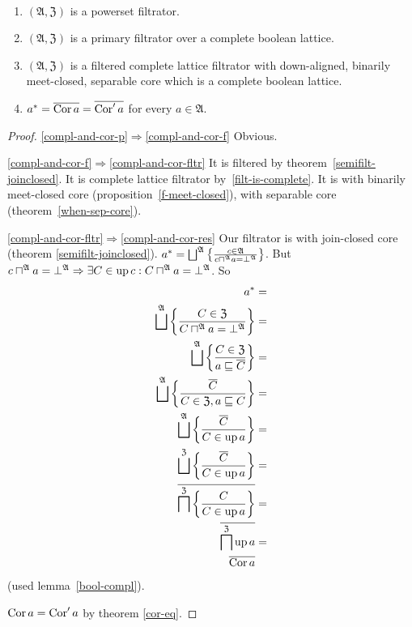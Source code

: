 \begin{thm}\label{compl-and-cor}
~
\begin{enumerate}
\item \label{compl-and-cor-p}$(\mathfrak{A},\mathfrak{Z})$ is a powerset filtrator.
\item \label{compl-and-cor-f}$(\mathfrak{A},\mathfrak{Z})$ is a primary filtrator over a complete boolean lattice.
\item \label{compl-and-cor-fltr}$(\mathfrak{A},\mathfrak{Z})$ is a filtered
complete lattice filtrator with down-aligned, binarily meet-closed,
separable core which is a complete boolean lattice.
\item \label{compl-and-cor-res} $a^{\ast}=\overline{\operatorname{Cor} a}=\overline{\operatorname{Cor}'a}$
for every $a\in\mathfrak{A}$.
\end{enumerate}
\end{thm}
\begin{proof}
\item [\ref{compl-and-cor-p}$\Rightarrow$\ref{compl-and-cor-f}] Obvious.
\item [\ref{compl-and-cor-f}$\Rightarrow$\ref{compl-and-cor-fltr}]
It is filtered by theorem~\ref{semifilt-joinclosed}. It is complete lattice filtrator by~\ref{filt-is-complete}.
It is with binarily meet-closed core (proposition~\ref{f-meet-closed}),
with separable core (theorem~\ref{when-sep-core}).
\item [\ref{compl-and-cor-fltr}$\Rightarrow$\ref{compl-and-cor-res}]
Our filtrator is with join-closed core (theorem \ref{semifilt-joinclosed}).
$a^{\ast}=\bigsqcup^{\mathfrak{A}}\setcond{c\in\mathfrak{A}}{c\sqcap^{\mathfrak{A}}a=\bot^{\mathfrak{A}}}$.
But $c\sqcap^{\mathfrak{A}}a=\bot^{\mathfrak{A}}\Rightarrow\exists C\in\operatorname{up} c:C\sqcap^{\mathfrak{A}}a=\bot^{\mathfrak{A}}$.
So
\begin{align*}
a^{\ast} & =\\
\bigsqcup^{\mathfrak{A}}\setcond{C\in\mathfrak{Z}}{C\sqcap^{\mathfrak{A}}a=\bot^{\mathfrak{A}}} & =\\
\bigsqcup^{\mathfrak{A}}\setcond{C\in\mathfrak{Z}}{a\sqsubseteq\overline{C}} & =\\
\bigsqcup^{\mathfrak{A}}\setcond{\overline{C}}{C\in\mathfrak{Z},a\sqsubseteq C} & =\\
\bigsqcup^{\mathfrak{A}}\setcond{\overline{C}}{C\in\up a} & =\\
\bigsqcup^{\mathfrak{Z}}\setcond{\overline{C}}{C\in\up a} & =\\
\overline{\bigsqcap^{\mathfrak{Z}}\setcond C{C\in\up a}} & =\\
\overline{\bigsqcap^{\mathfrak{Z}}\up a} & =\\
\overline{\Cor a}
\end{align*}
(used lemma~\ref{bool-compl}).

$\operatorname{Cor} a=\operatorname{Cor}'a$ by theorem \ref{cor-eq}.\end{proof}
